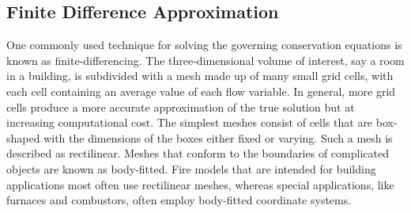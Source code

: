 \documentclass[graybox]{svmult}
\begin{document}
\subsection{Finite Difference Approximation}

\label{fin_diff}

One commonly used technique for solving the governing conservation equations is known as finite-differencing. The three-dimensional volume of interest, say a room in a building, is subdivided with a mesh made up of many small grid cells, with each cell containing an average value of each flow variable. In general, more grid cells produce a more accurate approximation of the true solution but at increasing computational cost. The simplest meshes consist of cells that are box-shaped with the dimensions of the boxes either fixed or varying. Such a mesh is described as rectilinear. Meshes that conform to the boundaries of complicated objects are known as body-fitted. Fire models that are intended for building applications most often use rectilinear meshes, whereas special applications, like furnaces and combustors, often employ body-fitted coordinate systems.
\end{document}

